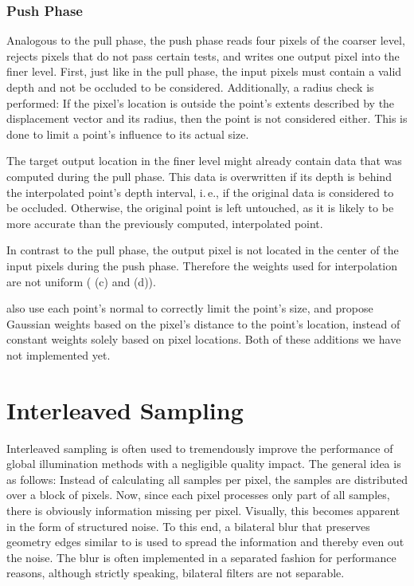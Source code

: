 \subsubsection{Push Phase}

Analogous to the pull phase, the push phase reads four pixels of the coarser level, rejects pixels that do not pass certain tests, and writes one output pixel into the finer level. First, just like in the pull phase, the input pixels must contain a valid depth and not be occluded to be considered. Additionally, a radius check is performed: If the pixel's location is outside the point's extents described by the displacement vector and its radius, then the point is not considered either. This is done to limit a point's influence to its actual size.

The target output location in the finer level might already contain data that was computed during the pull phase. This data is overwritten if its depth is behind the interpolated point's depth interval, i.\,e., if the original data is considered to be occluded. Otherwise, the original point is left untouched, as it is likely to be more accurate than the previously computed, interpolated point.

In contrast to the pull phase, the output pixel is not located in the center of the input pixels during the push phase. Therefore the weights used for interpolation are not uniform ( (c) and (d)).

 \citet{Marroquim:2007:reconstruction} also use each point's normal to correctly limit the point's size, and \citet{Marroquim:2008:reconstruction2} propose Gaussian weights based on the pixel's distance to the point's location, instead of constant weights solely based on pixel locations. Both of these additions we have not implemented yet.



 \section{Interleaved Sampling}
 \label{sec:concept:interleavedSampling}
 Interleaved sampling \citep{Keller:2001:InterleavedSampling} is often used to tremendously improve the performance of global illumination methods with a negligible quality impact. The general idea is as follows: Instead of calculating all samples per pixel, the samples are distributed over a block of pixels. Now, since each pixel processes only part of all samples, there is obviously information missing per pixel. Visually, this becomes apparent in the form of structured noise. To this end, a bilateral blur that preserves geometry edges similar to \citet{laine2007incremental} is used to spread the information and thereby even out the noise. The blur is often implemented in a separated fashion for performance reasons, although strictly speaking, bilateral filters are not separable.

